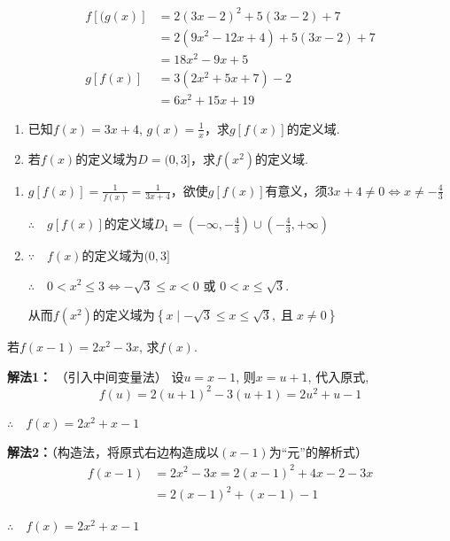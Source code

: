 \begin{solution}
\[\begin{split}
f[(g(x)]&=2(3x-2)^{2}+5(3x-2)+7\\
&=2\left(9x^{2}-12x+4\right)+5\left(3x-2\right)+7\\
&=18x^{2}-9x+5\\
g[f(x)]&=3(2x^{2}+5x+7)-2\\
&=6x^{2}+15x+19
\end{split}\]
\end{solution}

\begin{example}
\begin{enumerate}[(1)]
    \item  已知$f( x) = 3x+ 4$, $g( x) = \frac 1x$，求$g[f(x)]$的定义域.
    \item 若$f(x)$的定义域为$D=(0,3]$，求$f(x^2)$的定义域.
\end{enumerate}
  \end{example} 

\begin{solution}
\begin{enumerate}[(1)]
    \item $g[f(x)]=\frac{1}{f(x)}=\frac{1}{3x+4}$，欲使$g[f(x)]$有意义，须$3x+4\ne 0\Longleftrightarrow x\ne -\frac{4}{3}$
    
$\therefore\quad g[f(x)]$的定义域$D_1=\left(-\infty,-\frac{4}{3}\right)\cup\left(-\frac{4}{3},+\infty\right)$

\item $\because\quad f(x)$的定义域为$(0,3]$

$\therefore\quad 0<x^2\le 3 \Longleftrightarrow -\sqrt{3}\le x<0$ 或 $0<x\le \sqrt{3}$.

从而$f(x^2)$的定义域为$\left\{x\mid -\sqrt{3}\le x\le \sqrt{3},\; \text{且}\; x\ne 0\right\}$
\end{enumerate}
\end{solution}

\begin{example} 
    若$f(x-1)=2x^{2}-3x$, 求$f(x).$
\end{example}

\begin{solution}
\textbf{解法1：} （引入中间变量法）
设$u=x-1$, 则$x=u+1$, 代入原式,
$$f(u)=2(u+1)^{2}-3(u+1)=2u^{2}+u-1$$

$\therefore\quad f\left ( x\right ) = 2x^2+ x- 1$

\textbf{解法2：}（构造法，将原式右边构造成以$(x-1)$为“元”的解析式）
\[\begin{split}
    f(x-1)&=2x^{2}-3x=2(x-1)^{2}+4x-2-3x\\
    &=2\left(x-1\right)^{2}+\left(x-1\right)-1
\end{split}\]

$\therefore\quad f( x) = 2x^2+ x- 1$
\end{solution}

